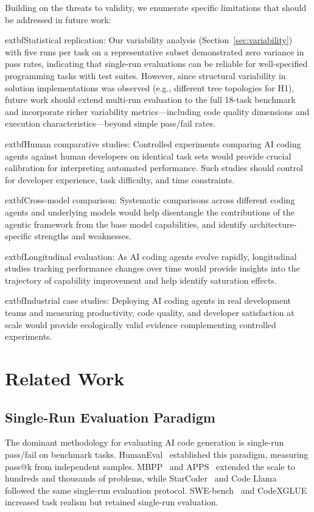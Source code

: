 \documentclass[conference]{IEEEtran}
\begin{document}
Building on the threats to validity, we enumerate specific limitations that should be addressed in future work:

			extbf{Statistical replication:} Our variability analysis (Section~\ref{sec:variability}) with five runs per task on a representative subset demonstrated zero variance in pass rates, indicating that single-run evaluations can be reliable for well-specified programming tasks with test suites. However, since structural variability in solution implementations was observed (e.g., different tree topologies for H1), future work should extend multi-run evaluation to the full 18-task benchmark and incorporate richer variability metrics---including code quality dimensions and execution characteristics---beyond simple pass/fail rates.

			extbf{Human comparative studies:} Controlled experiments comparing AI coding agents against human developers on identical task sets would provide crucial calibration for interpreting automated performance. Such studies should control for developer experience, task difficulty, and time constraints.

			extbf{Cross-model comparison:} Systematic comparisons across different coding agents and underlying models would help disentangle the contributions of the agentic framework from the base model capabilities, and identify architecture-specific strengths and weaknesses.

			extbf{Longitudinal evaluation:} As AI coding agents evolve rapidly, longitudinal studies tracking performance changes over time would provide insights into the trajectory of capability improvement and help identify saturation effects.

			extbf{Industrial case studies:} Deploying AI coding agents in real development teams and measuring productivity, code quality, and developer satisfaction at scale would provide ecologically valid evidence complementing controlled experiments.

\section{Related Work}
\label{sec:related}

\subsection{Single-Run Evaluation Paradigm}

The dominant methodology for evaluating AI code generation is single-run pass/fail on benchmark tasks. HumanEval~\cite{chen2021evaluating} established this paradigm, measuring pass@k from independent samples. MBPP~\cite{austin2021program} and APPS~\cite{hendrycks2021measuring} extended the scale to hundreds and thousands of problems, while StarCoder~\cite{li2023starcoder} and Code Llama~\cite{roziere2023code} followed the same single-run evaluation protocol. SWE-bench~\cite{jimenez2023swebench} and CodeXGLUE~\cite{lu2021codexglue} increased task realism but retained single-run evaluation.
\end{document}
